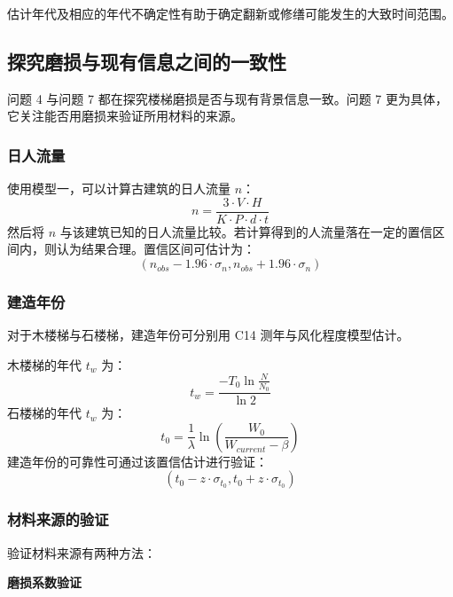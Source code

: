 \documentclass[11pt,a4paper]{ctexart}
\begin{document}
估计年代及相应的年代不确定性有助于确定翻新或修缮可能发生的大致时间范围。

\subsection{探究磨损与现有信息之间的一致性}

问题 4 与问题 7 都在探究楼梯磨损是否与现有背景信息一致。问题 7 更为具体，它关注能否用磨损来验证所用材料的来源。

\subsubsection{日人流量}

使用模型一，可以计算古建筑的日人流量 $n$：
\begin{equation}
n=\frac{3\cdot V\cdot H}{K\cdot P\cdot d\cdot t} \tag{35}
\end{equation}
然后将 $n$ 与该建筑已知的日人流量比较。若计算得到的人流量落在一定的置信区间内，则认为结果合理。置信区间可估计为：
\begin{equation}
(n_{obs}-1.96\cdot\sigma_n,n_{obs}+1.96\cdot\sigma_n) \tag{36}
\end{equation}

\subsubsection{建造年份}

对于木楼梯与石楼梯，建造年份可分别用 C14 测年与风化程度模型估计。

木楼梯的年代 $t_w$ 为：
\begin{equation}
t_w=\frac{-T_0\ln\frac{N}{N_0}}{\ln 2} \tag{37}
\end{equation}
石楼梯的年代 $t_w$ 为：
\begin{equation}
t_0=\frac{1}{\lambda}\ln\left(\frac{W_0}{W_{current}-\beta}\right) \tag{38}
\end{equation}
建造年份的可靠性可通过该置信估计进行验证：
\begin{equation}
(t_0-z\cdot\sigma_{t_0},t_0+z\cdot\sigma_{t_0}) \tag{39}
\end{equation}

\subsubsection{材料来源的验证}

验证材料来源有两种方法：

\textbf{磨损系数验证}
\end{document}
